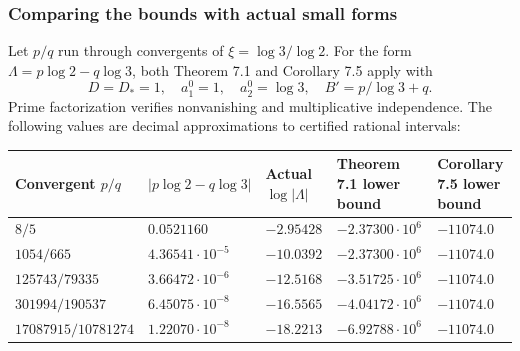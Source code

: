 \documentclass[
  11pt,
  a4paper,
]{article}
\newcounter{none} %
\begin{document}
\subsubsection{Comparing the bounds with actual small
forms}\label{comparing-the-bounds-with-actual-small-forms}

Let \(p/q\) run through convergents of \(\xi=\log3/\log2\). For the form
\(\Lambda=p\log2-q\log3\), both Theorem 7.1 and Corollary 7.5 apply with
\[
D=D_*=1,\quad a_1^0=1,\quad a_2^0=\log3,\quad
B'=p/\log3+q.
\] Prime factorization verifies nonvanishing and multiplicative
independence. The following values are decimal approximations to
certified rational intervals:

{\def\LTcaptype{none} %
\begin{longtable}[]{@{}
  >{\raggedright\arraybackslash}p{}
  >{\raggedleft\arraybackslash}p{}
  >{\raggedleft\arraybackslash}p{}
  >{\raggedleft\arraybackslash}p{}
  >{\raggedleft\arraybackslash}p{}@{}}
\toprule\noalign{}
\begin{minipage}[b]{\linewidth}\raggedright
Convergent \(p/q\)
\end{minipage} & \begin{minipage}[b]{\linewidth}\raggedleft
\(|p\log2-q\log3|\)
\end{minipage} & \begin{minipage}[b]{\linewidth}\raggedleft
Actual \(\log|\Lambda|\)
\end{minipage} & \begin{minipage}[b]{\linewidth}\raggedleft
Theorem 7.1 lower bound
\end{minipage} & \begin{minipage}[b]{\linewidth}\raggedleft
Corollary 7.5 lower bound
\end{minipage} \\
\midrule\noalign{}
\endhead
\bottomrule\noalign{}
\endlastfoot
\(8/5\) & \(0.0521160\) & \(-2.95428\) & \(-2.37300\cdot10^6\) &
\(-11074.0\) \\
\(1054/665\) & \(4.36541\cdot10^{-5}\) & \(-10.0392\) &
\(-2.37300\cdot10^6\) & \(-11074.0\) \\
\(125743/79335\) & \(3.66472\cdot10^{-6}\) & \(-12.5168\) &
\(-3.51725\cdot10^6\) & \(-11074.0\) \\
\(301994/190537\) & \(6.45075\cdot10^{-8}\) & \(-16.5565\) &
\(-4.04172\cdot10^6\) & \(-11074.0\) \\
\(17087915/10781274\) & \(1.22070\cdot10^{-8}\) & \(-18.2213\) &
\(-6.92788\cdot10^6\) & \(-11074.0\) \\
\end{longtable}
}
\end{document}
